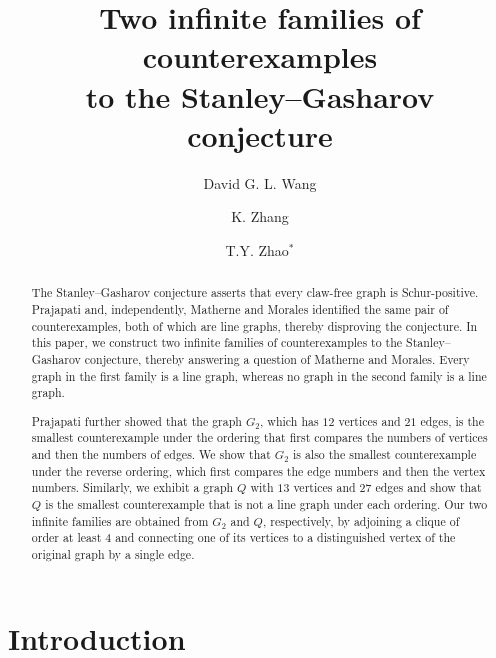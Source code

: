 \documentclass[11pt]{amsart}
\title[Two infinite counterexample families to the Stanley--Gasharov conjecture]
{Two infinite families of counterexamples\\
to the Stanley--Gasharov conjecture}
\author[D. G. L. Wang]{David G. L. Wang}
\author[K. Zhang]{K. Zhang}
\author[T.Y. Zhao]{T.Y. Zhao$^*$}
\date{}
\numberwithin{equation}{section}
\theoremstyle{remark}
\begin{document}
\begin{abstract}
The Stanley--Gasharov conjecture asserts that every claw-free graph is Schur-positive. Prajapati and, independently, Matherne and Morales identified the same pair of counterexamples, both of which are line graphs, thereby disproving the conjecture. In this paper, we construct two infinite families of counterexamples to the Stanley--Gasharov conjecture, thereby answering a question of Matherne and Morales. Every graph in the first family is a line graph, whereas no graph in the second family is a line graph.

Prajapati further showed that the graph $G_2$, which has $12$ vertices and $21$ edges, is the smallest counterexample under the ordering that first compares the numbers of vertices and then the numbers of edges. We show that $G_2$ is also the smallest counterexample under the reverse ordering, which first compares the edge numbers and then the vertex numbers. Similarly, we exhibit a graph $Q$ with $13$ vertices and $27$ edges and show that $Q$ is the smallest counterexample that is not a line graph under each ordering. Our two infinite families are obtained from $G_2$ and $Q$, respectively, by adjoining a clique of order at least $4$ and connecting one of its vertices to a distinguished vertex of the original graph by a single edge.
\end{abstract}
\maketitle

\section{Introduction}\label{sec:introduction}
\end{document}
